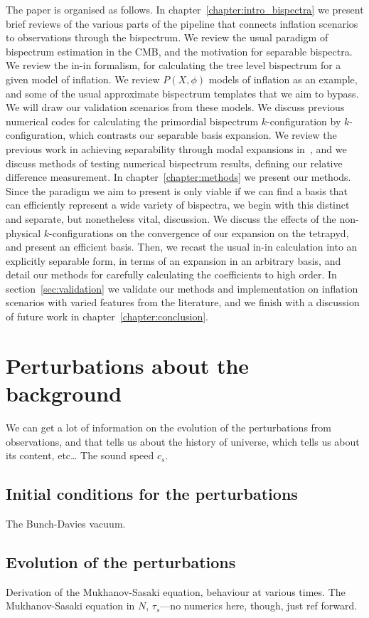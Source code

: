 The paper is organised as follows. In chapter~\ref{chapter:intro_bispectra} we present brief reviews
of the various parts of the pipeline that connects inflation scenarios to observations
through the bispectrum.
We review the usual paradigm of bispectrum estimation in the CMB,
and the motivation for separable bispectra. We review the in-in formalism,
for calculating the tree level bispectrum for a given model of inflation.
We review $P(X,\phi)$ models of inflation as an example, and
some of the usual approximate bispectrum templates
that we aim to bypass.
We will draw our validation scenarios from these models.
We discuss previous numerical codes for
calculating the primordial bispectrum $k$-configuration by $k$-configuration,
which contrasts our separable basis expansion.
We review the previous work in achieving separability through modal expansions
in~\cite{Funakoshi},
and we discuss methods of testing
numerical bispectrum results, defining our relative difference measurement.
In chapter~\ref{chapter:methods} we present our methods.
Since the paradigm we aim to present is only viable if we can find a basis
that can efficiently represent a wide variety of bispectra,
we begin with this distinct and separate, but nonetheless vital, discussion.
We discuss the effects of the
non-physical $k$-configurations on the convergence of our expansion on
the tetrapyd, and present an efficient basis.
Then, we recast the usual in-in calculation into an explicitly separable form,
in terms of an expansion in an arbitrary basis,
and detail our methods for carefully calculating the coefficients to high order.
In section~\ref{sec:validation} we validate our methods and implementation
on inflation scenarios with varied features from the literature,
and we finish with a discussion of future work in chapter~\ref{chapter:conclusion}.

\section{Perturbations about the background}
    We can get a lot of information on the evolution of the perturbations
    from observations, and that tells us about the history of universe,
    which tells us about its content, etc\ldots
    \newpage
    The sound speed $c_s$.
    \newpage
    \subsection{Initial conditions for the perturbations}
    The Bunch-Davies vacuum.
    \newpage
    \subsection{Evolution of the perturbations}
    Derivation of the Mukhanov-Sasaki equation, behaviour at various times.
    \newpage
    The Mukhanov-Sasaki equation in $N$, $\tau_s$---no numerics here, though, just ref forward.
    \newpage
